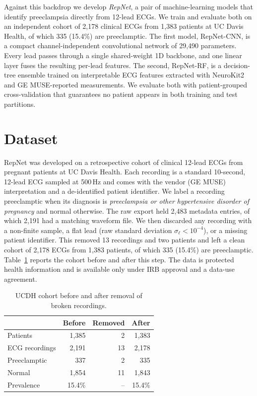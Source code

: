 \documentclass[sigconf,nonacm]{acmart}
\begin{document}
Against this backdrop we develop \textit{RepNet}, a pair of machine-learning
models that identify preeclampsia directly from 12-lead ECGs. We train and
evaluate both on an independent cohort of 2,178 clinical ECGs from 1,383
patients at UC Davis Health, of which 335 (15.4\%) are preeclamptic. The first
model, RepNet-CNN, is a compact channel-independent convolutional network of
29,490 parameters. Every lead passes through a single shared-weight 1D
backbone, and one linear layer fuses the resulting per-lead features. The
second, RepNet-RF, is a decision-tree ensemble trained on interpretable ECG
features extracted with NeuroKit2 and GE MUSE-reported measurements. We
evaluate both with patient-grouped cross-validation that guarantees no patient
appears in both training and test partitions.

\section{Dataset}
\label{sec:data}

RepNet was developed on a retrospective cohort of clinical 12-lead ECGs from
pregnant patients at UC Davis Health. Each recording is a standard 10-second,
12-lead ECG sampled at 500\,Hz and comes with the vendor (GE MUSE)
interpretation and a de-identified patient identifier. We label a recording
preeclamptic when its diagnosis is \emph{preeclampsia or other hypertensive
disorder of pregnancy} and normal otherwise. The raw export held 2,483
metadata entries, of which 2,191 had a matching waveform file. We then
discarded any recording with a non-finite sample, a flat lead (raw standard
deviation $\sigma_\ell < 10^{-4}$), or a missing patient identifier. This
removed 13 recordings and two patients and left a clean cohort of 2,178 ECGs
from 1,383 patients, of which 335 (15.4\%) are preeclamptic.
Table~\ref{tab:cohort} reports the cohort before and after this step. The data
is protected health information and is available only under IRB approval and a
data-use agreement.

\begin{table}[H]
\centering
\caption{UCDH cohort before and after removal of broken recordings.}
\label{tab:cohort}
\small
\begin{tabular}{@{}lrrr@{}}
\toprule
& \textbf{Before} & \textbf{Removed} & \textbf{After} \\
\midrule
Patients & 1{,}385 & 2 & 1{,}383 \\
ECG recordings & 2{,}191 & 13 & 2{,}178 \\
\midrule
Preeclamptic & 337 & 2 & 335 \\
Normal & 1{,}854 & 11 & 1{,}843 \\
Prevalence & 15.4\% & -- & 15.4\% \\
\bottomrule
\end{tabular}
\end{table}
\end{document}
